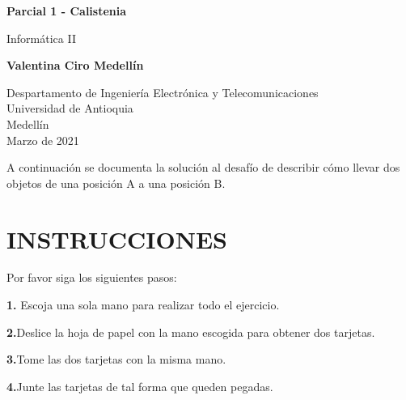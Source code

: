 \documentclass{article}
\begin{document}
\begin{titlepage}
    \begin{center}
        \vspace*{1cm}
            
        \Huge
        \textbf{Parcial 1 - Calistenia}
            
        \vspace{0.5cm}
        \LARGE
        Informática II
            
        \vspace{1.5cm}
            
        \textbf{Valentina Ciro Medellín}
            
        \vfill
            
        \vspace{0.8cm}
            
        \Large
        Despartamento de Ingeniería Electrónica y Telecomunicaciones\\
        Universidad de Antioquia\\
        Medellín\\
        Marzo de 2021
            
    \end{center}
\end{titlepage}


\newpage 

A continuación se documenta la solución al desafío de describir cómo llevar dos objetos de una posición A a una posición B.
\vspace{0.8cm}
\section*{INSTRUCCIONES}
Por favor siga los siguientes pasos:
\vspace{0.8cm}

\textbf{1.} Escoja una sola mano para realizar todo el ejercicio.
\vspace{0.5cm}


\textbf{2.}Deslice la hoja de papel con la mano escogida para obtener dos tarjetas.
\vspace{0.5cm}

\textbf{3.}Tome las dos tarjetas con la misma mano.

\vspace{0.5cm}

\textbf{4.}Junte las tarjetas de tal forma que queden pegadas.
\vspace{0.5cm}
\end{document}
